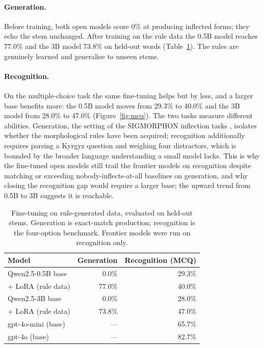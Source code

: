 \documentclass[11pt]{article}
\begin{document}
\paragraph{Generation.} Before training, both open models score 0\% at producing
inflected forms; they echo the stem unchanged. After training on the rule data the
0.5B model reaches 77.0\% and the 3B model 73.8\% on held-out words
(Table~\ref{tab:finetune}). The rules are genuinely learned and generalise to unseen
stems.

\paragraph{Recognition.} On the multiple-choice task the same fine-tuning helps but by
less, and a larger base benefits more: the 0.5B model moves from 29.3\% to 40.0\% and
the 3B model from 28.0\% to 47.0\% (Figure~\ref{fig:mcq}). The two tasks measure
different abilities. Generation, the setting of the SIGMORPHON inflection
tasks \cite{vylomova2020sigmorphon}, isolates whether the morphological rules have been
acquired; recognition additionally requires parsing a Kyrgyz question and weighing four
distractors, which is bounded by the broader language understanding a small model
lacks. This is why the fine-tuned open models still trail the frontier models on
recognition despite matching or exceeding nobody-inflects-at-all baselines on
generation, and why closing the recognition gap would require a larger base; the upward
trend from 0.5B to 3B suggests it is reachable.

\begin{table}[h]
\centering
\small
\begin{tabular}{lrr}
\toprule
Model & Generation & Recognition (MCQ) \\
\midrule
Qwen2.5-0.5B base          & 0.0\%  & 29.3\% \\
\quad + LoRA (rule data)   & 77.0\% & 40.0\% \\
Qwen2.5-3B base            & 0.0\%  & 28.0\% \\
\quad + LoRA (rule data)   & 73.8\% & 47.0\% \\
gpt-4o-mini (base)         & ---    & 65.7\% \\
gpt-4o (base)              & ---    & 82.7\% \\
\bottomrule
\end{tabular}
\caption{Fine-tuning on rule-generated data, evaluated on held-out stems. Generation
is exact-match production; recognition is the four-option benchmark. Frontier models
were run on recognition only.}
\label{tab:finetune}
\end{table}
\end{document}
